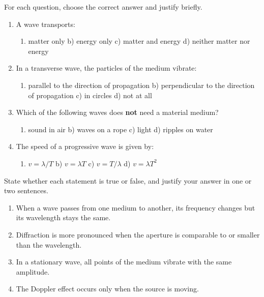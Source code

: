 \documentclass[11pt]{article}
\begin{document}
\begin{exercice}
For each question, choose the correct answer and justify briefly.
\begin{enumerate}
\item A wave transports:
\begin{enumerate}
\item matter only \quad b) energy only \quad c) matter and energy \quad d) neither matter nor energy
\end{enumerate}
\item In a transverse wave, the particles of the medium vibrate:
\begin{enumerate}
\item parallel to the direction of propagation \quad b) perpendicular to the direction of propagation \quad c) in circles \quad d) not at all
\end{enumerate}
\item Which of the following waves does \textbf{not} need a material medium?
\begin{enumerate}
\item sound in air \quad b) waves on a rope \quad c) light \quad d) ripples on water
\end{enumerate}
\item The speed of a progressive wave is given by:
\begin{enumerate}
\item $v = \lambda/T$ \quad b) $v = \lambda T$ \quad c) $v = T/\lambda$ \quad d) $v = \lambda T^2$
\end{enumerate}
\end{enumerate}
\end{exercice}

\begin{exercice}
State whether each statement is true or false, and justify your answer in one or two sentences.
\begin{enumerate}
\item When a wave passes from one medium to another, its frequency changes but its wavelength stays the same.
\item Diffraction is more pronounced when the aperture is comparable to or smaller than the wavelength.
\item In a stationary wave, all points of the medium vibrate with the same amplitude.
\item The Doppler effect occurs only when the source is moving.
\end{enumerate}
\end{exercice}
\end{document}
